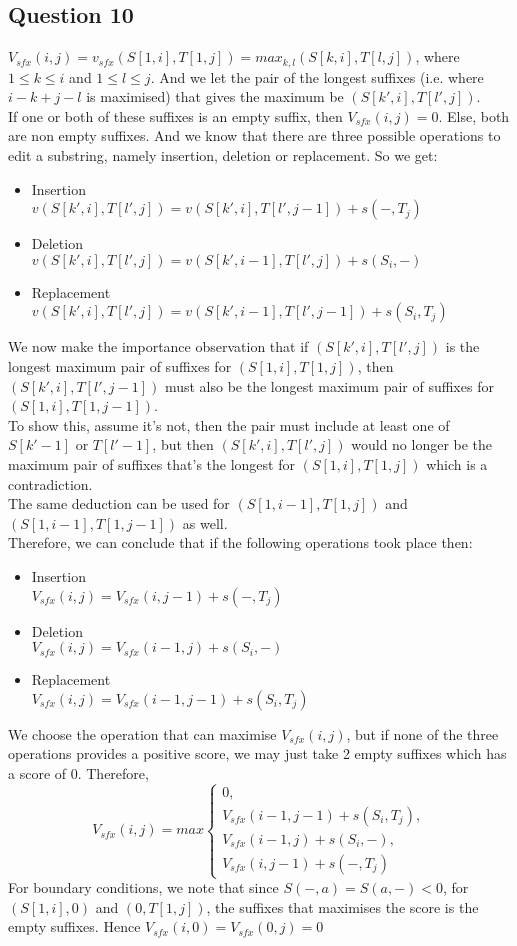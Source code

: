 \documentclass[10pt]{article}
\begin{document}
\subsection*{Question 10}
$V_{sfx}(i,j)=v_{sfx}(S[1,i],T[1,j])=max_{k,l}(S[k,i],T[l,j])$, where $1\leq k \leq i$ and $1 \leq l \leq j$. And we let the pair of the longest suffixes (i.e. where $i-k+j-l$ is maximised) that gives the maximum be $(S[k',i],T[l',j])$.\\ If one or both of these suffixes is an empty suffix, then $V_{sfx}(i,j)=0$. Else, both are non empty suffixes. And we know that there are three possible operations to edit a substring, namely insertion, deletion or replacement. So we get:
\begin{itemize}
    \item Insertion\\
    $v(S[k',i],T[l',j])=v(S[k',i],T[l',j-1])+s(-,T_j)$
    \item Deletion\\
    $v(S[k',i],T[l',j])=v(S[k',i-1],T[l',j])+s(S_i,-)$
    \item Replacement\\
    $v(S[k',i],T[l',j])=v(S[k',i-1],T[l',j-1])+s(S_i,T_j)$
\end{itemize}
We now make the importance observation that if $(S[k',i],T[l',j])$ is the longest maximum pair of suffixes for $(S[1,i],T[1,j])$, then $(S[k',i],T[l',j-1])$ must also be the longest maximum pair of suffixes for $(S[1,i],T[1,j-1])$.\\
To show this, assume it's not, then the pair must include at least one of $S[k'-1]$ or $T[l'-1]$, but then $(S[k',i],T[l',j])$ would no longer be the maximum pair of suffixes that's the longest for $(S[1,i],T[1,j])$ which is a contradiction.\\
The same deduction can be used for $(S[1,i-1],T[1,j])$ and $(S[1,i-1],T[1,j-1])$ as well.\\
Therefore, we can conclude that if the following operations took place then:
\begin{itemize}
    \item Insertion\\
    $V_{sfx}(i,j)=V_{sfx}(i,j-1)+s(-,T_j)$
    \item Deletion\\
    $V_{sfx}(i,j)=V_{sfx}(i-1,j)+s(S_i,-)$
    \item Replacement\\
    $V_{sfx}(i,j)=V_{sfx}(i-1,j-1)+s(S_i,T_j)$
\end{itemize}
We choose the operation that can maximise $V_{sfx}(i,j)$, but if none of the three operations provides a positive score, we may just take 2 empty suffixes which has a score of 0. Therefore, \[V_{sfx}(i,j)=max\left
\{\begin{array}{lr}
0,\\
V_{sfx}(i-1,j-1)+s(S_i,T_j),\\
V_{sfx}(i-1,j)+s(S_i,-),\\
V_{sfx}(i,j-1)+s(-,T_j)
\end{array}
\right.\]
For boundary conditions, we note that since $S(-,a)=S(a,-)<0$, for $(S[1,i],0)$ and $(0,T[1,j])$, the suffixes that maximises the score is the empty suffixes. Hence $V_{sfx}(i,0)=V_{sfx}(0,j)=0$
\end{document}
